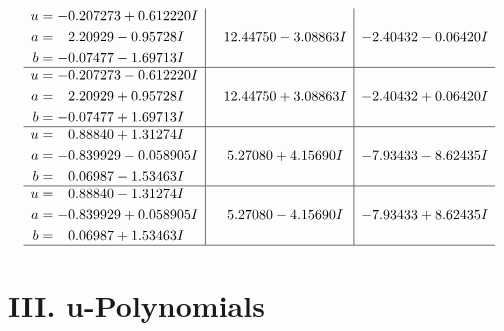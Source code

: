 \documentclass[1p]{elsarticle_modified}
\theoremstyle{definition}
\begin{document}
$$\begin{array}{c|c|c}
\begin{aligned}
u &= -0.207273 + 0.612220 I \\
a &= \phantom{-}2.20929 - 0.95728 I \\
b &= -0.07477 - 1.69713 I\end{aligned}
 & \phantom{-}12.44750 - 3.08863 I & -2.40432 - 0.06420 I \\ \hline\begin{aligned}
u &= -0.207273 - 0.612220 I \\
a &= \phantom{-}2.20929 + 0.95728 I \\
b &= -0.07477 + 1.69713 I\end{aligned}
 & \phantom{-}12.44750 + 3.08863 I & -2.40432 + 0.06420 I \\ \hline\begin{aligned}
u &= \phantom{-}0.88840 + 1.31274 I \\
a &= -0.839929 - 0.058905 I \\
b &= \phantom{-}0.06987 - 1.53463 I\end{aligned}
 & \phantom{-}5.27080 + 4.15690 I & -7.93433 - 8.62435 I \\ \hline\begin{aligned}
u &= \phantom{-}0.88840 - 1.31274 I \\
a &= -0.839929 + 0.058905 I \\
b &= \phantom{-}0.06987 + 1.53463 I\end{aligned}
 & \phantom{-}5.27080 - 4.15690 I & -7.93433 + 8.62435 I\\
 \hline 
 \end{array}$$\newpage
\newpage\renewcommand{\arraystretch}{1}
\centering \section*{ III. u-Polynomials}
\end{document}
